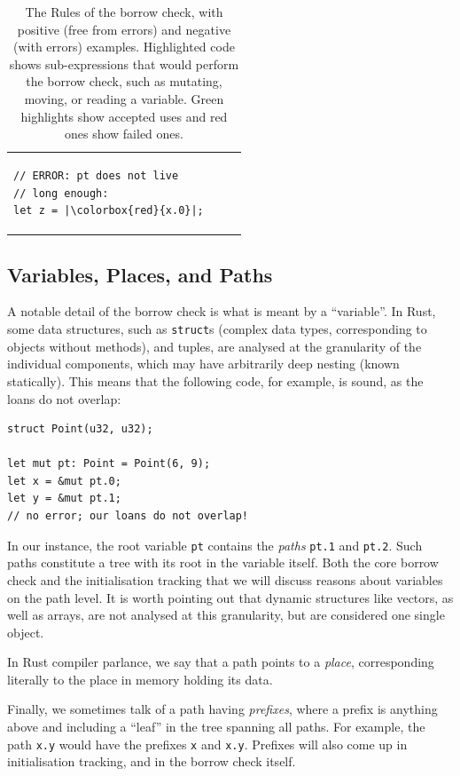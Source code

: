 \documentclass[11pt,a4paper,twoside,openany,draft]{report}
\newcommand{\InRust}[1]{\texttt{#1}}
\begin{document}
{\begin{table}[h]
\begin{tabular}{p{} p{} p{}}
\begin{minipage}[t]{0.41\textwidth}
\begin{verbatim}
// ERROR: pt does not live
// long enough:
let z = |\colorbox{red}{x.0}|; 
\end{verbatim}
  \end{minipage}
\end{tabular}
\caption[The Rules of the Borrow Check]{The Rules of the borrow check, with
  positive (free from errors) and negative (with errors) examples.
  Highlighted code shows sub-expressions that would perform the borrow check,
  such as mutating, moving, or reading a variable. Green highlights show
  accepted uses and red ones show failed ones.}
  \label{tab:borrow-check}
\end{table}%
}


\subsection{Variables, Places, and Paths}
\label{sec:vars-places-paths}

A notable detail of the borrow check is what is meant by a ``variable''. In
Rust, some data structures, such as \InRust{struct}s (complex data types,
corresponding to objects without methods), and tuples, are analysed at the
granularity of the individual components, which may have arbitrarily deep
nesting (known statically). This means that the following code, for example, is
sound, as the loans do not overlap:
\begin{verbatim}
struct Point(u32, u32);

let mut pt: Point = Point(6, 9);
let x = &mut pt.0;
let y = &mut pt.1;
// no error; our loans do not overlap!
\end{verbatim}

In our instance, the root variable \InRust{pt} contains the \emph{paths}
\InRust{pt.1} and \InRust{pt.2}. Such paths constitute a tree with its root in
the variable itself. Both the core borrow check and the initialisation tracking
that we will discuss reasons about variables on the path level. It is worth
pointing out that dynamic structures like vectors, as well as arrays, are not
analysed at this granularity, but are considered one single object.

In Rust compiler parlance, we say that a path points to a \emph{place},
corresponding literally to the place in memory holding its data.

Finally, we sometimes talk of a path having \emph{prefixes}, where a prefix is
anything above and including a ``leaf'' in the tree spanning all paths. For
example, the path \InRust{x.y} would have the prefixes \InRust{x} and
\InRust{x.y}. Prefixes will also come up in initialisation tracking, and in the
borrow check itself.
\end{document}
